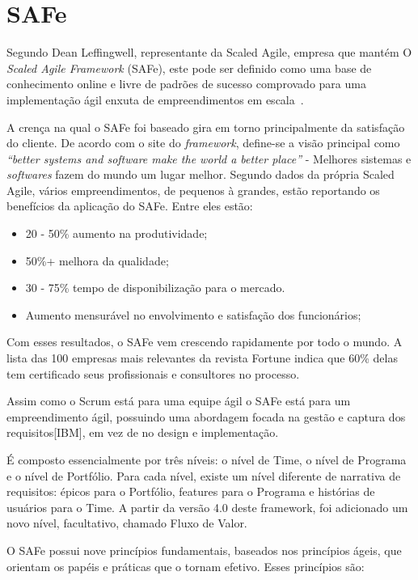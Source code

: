   \section{SAFe}
Segundo Dean Leffingwell, representante da Scaled Agile, empresa que mantém O \textit{Scaled Agile Framework} (SAFe), este pode ser definido como uma base de conhecimento online e livre de padrões de sucesso comprovado para uma implementação ágil enxuta de empreendimentos em escala~\cite{deanleffingwell}.

A crença na qual o SAFe foi baseado gira em torno principalmente da satisfação do cliente. De acordo com o site do \textit{framework}, define-se a visão principal como \textit{“better systems and software make the world a better place”} - Melhores sistemas e \textit{softwares} fazem do mundo um lugar melhor.
Segundo dados da própria Scaled Agile, vários empreendimentos, de pequenos à grandes, estão reportando os benefícios da aplicação do SAFe. Entre eles estão:

\begin{itemize}
\item 20 - 50\% aumento na produtividade;
\item 50\%+ melhora da qualidade;
\item 30 - 75\% tempo de disponibilização para o mercado.
\item Aumento mensurável no envolvimento e satisfação dos funcionários;
\end{itemize}

Com esses resultados, o SAFe vem crescendo rapidamente por todo o mundo. A lista das 100 empresas mais relevantes da revista Fortune indica que 60\% delas tem certificado seus profissionais e consultores no processo.

Assim como o Scrum está para uma equipe ágil o SAFe está para um empreendimento ágil, possuindo uma abordagem focada na gestão e captura dos requisitos[IBM], em vez de no design e implementação.

É composto essencialmente por três níveis: o nível de Time, o nível de Programa e o nível de Portfólio. Para cada nível, existe um nível diferente de narrativa de requisitos: épicos para o Portfólio, features para o Programa e histórias de usuários para o Time. A partir da versão 4.0 deste framework, foi adicionado um novo nível, facultativo, chamado Fluxo de Valor.

O SAFe possui nove princípios fundamentais, baseados nos princípios ágeis, que orientam os papéis e práticas que o tornam efetivo. Esses princípios são:

